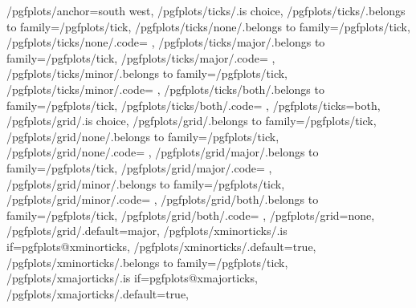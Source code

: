 {	/pgfplots/anchor=south west,
	/pgfplots/ticks/.is choice,
	/pgfplots/ticks/.belongs to family=/pgfplots/tick,
	/pgfplots/ticks/none/.belongs to family=/pgfplots/tick,
	/pgfplots/ticks/none/.code={%
		\pgfplots@xminorticksfalse
		\pgfplots@yminorticksfalse
		\pgfplots@zminorticksfalse
		\pgfplots@xmajorticksfalse
		\pgfplots@ymajorticksfalse
		\pgfplots@zmajorticksfalse
	},
	/pgfplots/ticks/major/.belongs to family=/pgfplots/tick,
	/pgfplots/ticks/major/.code={%
		\pgfplots@xminorticksfalse
		\pgfplots@yminorticksfalse
		\pgfplots@zminorticksfalse
		\pgfplots@xmajortickstrue
		\pgfplots@ymajortickstrue
		\pgfplots@zmajortickstrue
	},
	/pgfplots/ticks/minor/.belongs to family=/pgfplots/tick,
	/pgfplots/ticks/minor/.code={%
		\pgfplots@xminortickstrue
		\pgfplots@yminortickstrue
		\pgfplots@zminortickstrue
		\pgfplots@xmajorticksfalse
		\pgfplots@ymajorticksfalse
		\pgfplots@zmajorticksfalse
	},
	/pgfplots/ticks/both/.belongs to family=/pgfplots/tick,
	/pgfplots/ticks/both/.code={%
		\pgfplots@xminortickstrue
		\pgfplots@yminortickstrue
		\pgfplots@zminortickstrue
		\pgfplots@xmajortickstrue
		\pgfplots@ymajortickstrue
		\pgfplots@zmajortickstrue
	},
	/pgfplots/ticks=both,
	/pgfplots/grid/.is choice,
	/pgfplots/grid/.belongs to family=/pgfplots/tick,
	/pgfplots/grid/none/.belongs to family=/pgfplots/tick,
	/pgfplots/grid/none/.code={%
		\pgfplots@xminorgridsfalse
		\pgfplots@yminorgridsfalse
		\pgfplots@zminorgridsfalse
		\pgfplots@xmajorgridsfalse
		\pgfplots@ymajorgridsfalse
		\pgfplots@zmajorgridsfalse
	},
	/pgfplots/grid/major/.belongs to family=/pgfplots/tick,
	/pgfplots/grid/major/.code={%
		\pgfplots@xminorgridsfalse
		\pgfplots@yminorgridsfalse
		\pgfplots@zminorgridsfalse
		\pgfplots@xmajorgridstrue
		\pgfplots@ymajorgridstrue
		\pgfplots@zmajorgridstrue
	},
	/pgfplots/grid/minor/.belongs to family=/pgfplots/tick,
	/pgfplots/grid/minor/.code={%
		\pgfplots@xminorgridstrue
		\pgfplots@yminorgridstrue
		\pgfplots@zminorgridstrue
		\pgfplots@xmajorgridsfalse
		\pgfplots@ymajorgridsfalse
		\pgfplots@zmajorgridsfalse
	},
	/pgfplots/grid/both/.belongs to family=/pgfplots/tick,
	/pgfplots/grid/both/.code={%
		\pgfplots@xminorgridstrue
		\pgfplots@yminorgridstrue
		\pgfplots@zminorgridstrue
		\pgfplots@xmajorgridstrue
		\pgfplots@ymajorgridstrue
		\pgfplots@zmajorgridstrue
	},
	/pgfplots/grid=none,
	/pgfplots/grid/.default=major,
	/pgfplots/xminorticks/.is if=pgfplots@xminorticks,
	/pgfplots/xminorticks/.default=true,
	/pgfplots/xminorticks/.belongs to family=/pgfplots/tick,
	/pgfplots/xmajorticks/.is if=pgfplots@xmajorticks,
	/pgfplots/xmajorticks/.default=true,
}

